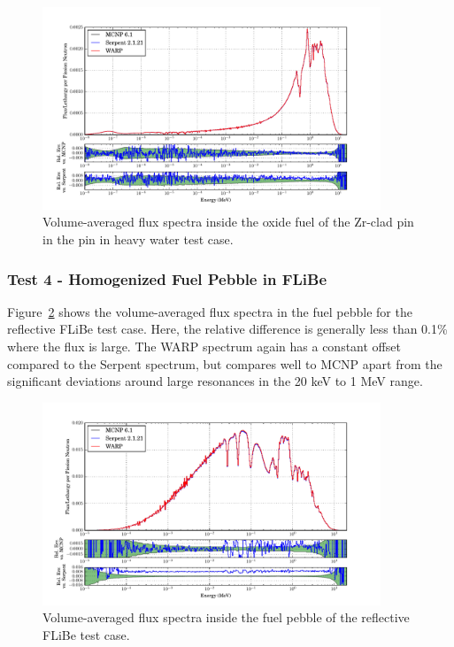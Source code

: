 \documentclass[preprint,12pt]{elsarticle}
\begin{document}
\begin{figure}[!htbp]
\centering
\includegraphics[width=0.9\textwidth,trim= 1cm 0cm 1cm 0cm]{graphics/pincell_spec.pdf}
\caption{Volume-averaged flux spectra inside the oxide fuel of the Zr-clad pin in the pin in heavy water test case. \label{pincell_spec} }
\end{figure}

\newpage
\subsubsection{Test 4 - Homogenized Fuel Pebble in FLiBe}

Figure~\ref{flibe_spec} shows the volume-averaged flux spectra in the fuel pebble for the reflective FLiBe test case.  Here, the relative difference is generally less than 0.1\% where the flux is large.  The WARP spectrum again has a constant offset compared to the Serpent spectrum, but compares well to MCNP apart from the significant deviations around large resonances in the 20 keV to 1 MeV range.  

\begin{figure}[!htbp]
\centering
\includegraphics[width=0.9\textwidth,trim= 1cm 0cm 1cm 0cm]{graphics/flibe_spec.pdf}
\caption{Volume-averaged flux spectra inside the fuel pebble of the reflective FLiBe test case. \label{flibe_spec} }
\end{figure}
\end{document}

